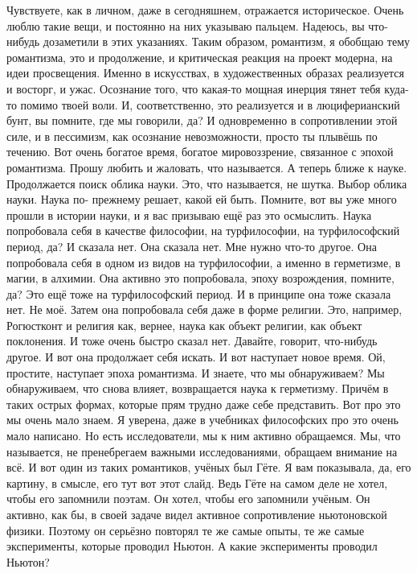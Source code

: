 Чувствуете, как в личном, даже в сегодняшнем, отражается историческое. Очень
люблю такие вещи, и постоянно на них указываю пальцем. Надеюсь, вы что-нибудь
дозаметили в этих указаниях. Таким образом, романтизм, я обобщаю тему
романтизма, это и продолжение, и критическая реакция на проект модерна, на идеи
просвещения. Именно в искусствах, в художественных образах реализуется и
восторг, и ужас. Осознание того, что какая-то мощная инерция тянет тебя куда-то
помимо твоей воли. И, соответственно, это реализуется и в люциферианский бунт,
вы помните, где мы говорили, да? И одновременно в сопротивлении этой силе, и в
пессимизм, как осознание невозможности, просто ты плывёшь по течению. Вот очень
богатое время, богатое мировоззрение, связанное с эпохой романтизма. Прошу
любить и жаловать, что называется. А теперь ближе к науке. Продолжается поиск
облика науки. Это, что называется, не шутка. Выбор облика науки. Наука по-
прежнему решает, какой ей быть. Помните, вот вы уже много прошли в истории
науки, и я вас призываю ещё раз это осмыслить. Наука попробовала себя в качестве
философии, на турфилософии, на турфилософский период, да? И сказала нет. Она
сказала нет. Мне нужно что-то другое. Она попробовала себя в одном из видов на
турфилософии, а именно в герметизме, в магии, в алхимии. Она активно это
попробовала, эпоху возрождения, помните, да? Это ещё тоже на турфилософский
период. И в принципе она тоже сказала нет. Не моё. Затем она попробовала себя
даже в форме религии. Это, например, Рогюстконт и религия как, вернее, наука как
объект религии, как объект поклонения. И тоже очень быстро сказал нет. Давайте,
говорит, что-нибудь другое. И вот она продолжает себя искать. И вот наступает
новое время. Ой, простите, наступает эпоха романтизма. И знаете, что мы
обнаруживаем? Мы обнаруживаем, что снова влияет, возвращается наука к
герметизму. Причём в таких острых формах, которые прям трудно даже себе
представить. Вот про это мы очень мало знаем. Я уверена, даже в учебниках
философских про это очень мало написано. Но есть исследователи, мы к ним активно
обращаемся. Мы, что называется, не пренебрегаем важными исследованиями, обращаем
внимание на всё. И вот один из таких романтиков, учёных был Гёте. Я вам
показывала, да, его картину, в смысле, его тут вот этот слайд. Ведь Гёте на
самом деле не хотел, чтобы его запомнили поэтам. Он хотел, чтобы его запомнили
учёным. Он активно, как бы, в своей задаче видел активное сопротивление
ньютоновской физики. Поэтому он серьёзно повторял те же самые опыты, те же самые
эксперименты, которые проводил Ньютон. А какие эксперименты проводил Ньютон?
